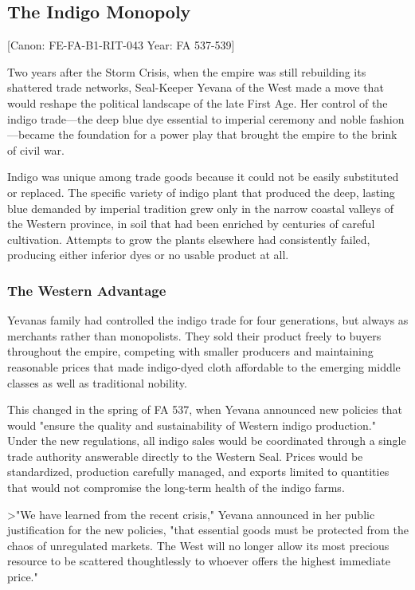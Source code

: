\subsection{The Indigo Monopoly}\label{the-indigo-monopoly}

{[}Canon: FE-FA-B1-RIT-043 \textbar{} Year: FA 537-539{]}

Two years after the Storm Crisis, when the empire was still rebuilding
its shattered trade networks, Seal-Keeper Yevana of the West made a move
that would reshape the political landscape of the late First Age. Her
control of the indigo trade---the deep blue dye essential to imperial
ceremony and noble fashion---became the foundation for a power play that
brought the empire to the brink of civil war.

Indigo was unique among trade goods because it could not be easily
substituted or replaced. The specific variety of indigo plant that
produced the deep, lasting blue demanded by imperial tradition grew only
in the narrow coastal valleys of the Western province, in soil that had
been enriched by centuries of careful cultivation. Attempts to grow the
plants elsewhere had consistently failed, producing either inferior dyes
or no usable product at all.

\subsubsection{The Western Advantage}\label{the-western-advantage}

Yevana\textquotesingle s family had controlled the indigo trade for four
generations, but always as merchants rather than monopolists. They sold
their product freely to buyers throughout the empire, competing with
smaller producers and maintaining reasonable prices that made
indigo-dyed cloth affordable to the emerging middle classes as well as
traditional nobility.

This changed in the spring of FA 537, when Yevana announced new policies
that would "ensure the quality and sustainability of Western indigo
production." Under the new regulations, all indigo sales would be
coordinated through a single trade authority answerable directly to the
Western Seal. Prices would be standardized, production carefully
managed, and exports limited to quantities that would not compromise the
long-term health of the indigo farms.

\textgreater"We have learned from the recent crisis," Yevana announced
in her public justification for the new policies, "that essential goods
must be protected from the chaos of unregulated markets. The West will
no longer allow its most precious resource to be scattered thoughtlessly
to whoever offers the highest immediate price."

